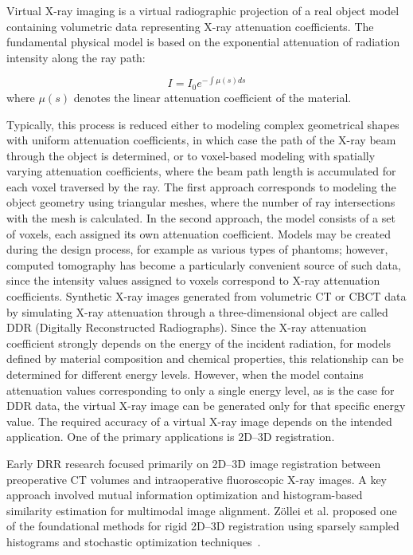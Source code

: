 \documentclass[11pt,a4paper]{article}
\begin{document}
Virtual X-ray imaging is a virtual radiographic projection of a real object model containing volumetric data representing X-ray attenuation coefficients. The fundamental physical model is based on the exponential attenuation of radiation intensity along the ray path:

\begin{equation}
I=I_0 e^{-\int \mu(s)ds}
\end{equation}
where $\mu(s)$ denotes the linear attenuation coefficient of the material.

Typically, this process is reduced either to modeling complex geometrical shapes with uniform attenuation coefficients, in which case the path of the X-ray beam through the object is determined, or to voxel-based modeling with spatially varying attenuation coefficients, where the beam path length is accumulated for each voxel traversed by the ray.
The first approach corresponds to modeling the object geometry using triangular meshes, where the number of ray intersections with the mesh is calculated. In the second approach, the model consists of a set of voxels, each assigned its own attenuation coefficient. Models may be created during the design process, for example as various types of phantoms; however, computed tomography has become a particularly convenient source of such data, since the intensity values assigned to voxels correspond to X-ray attenuation coefficients. Synthetic X-ray images generated from volumetric CT or CBCT data by simulating X-ray attenuation through a three-dimensional object are called DDR (Digitally Reconstructed Radiographs). Since the X-ray attenuation coefficient strongly depends on the energy of the incident radiation, for models defined by material composition and chemical properties, this relationship can be determined for different energy levels. However, when the model contains attenuation values corresponding to only a single energy level, as is the case for DDR data, the virtual X-ray image can be generated only for that specific energy value.
The required accuracy of a virtual X-ray image depends on the intended application. One of the primary applications is 2D--3D registration.

Early DRR research focused primarily on 2D--3D image registration between preoperative CT volumes and intraoperative fluoroscopic X-ray images. A key approach involved mutual information optimization and histogram-based similarity estimation for multimodal image alignment. Zöllei et al. proposed one of the foundational methods for rigid 2D--3D registration using sparsely sampled histograms and stochastic optimization techniques~\cite{Zollei2001MICCAI}.
\end{document}
